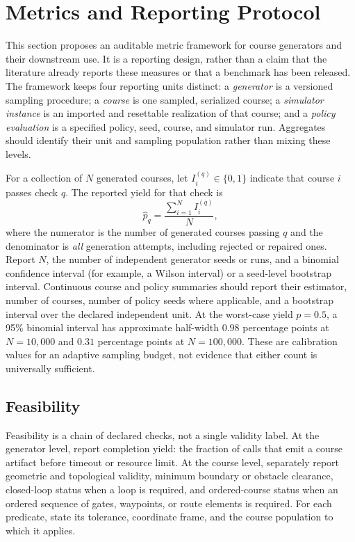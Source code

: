 \section{Metrics and Reporting Protocol}
\label{sec:metrics}

This section proposes an auditable metric framework for course generators and their
downstream use. It is a reporting design, rather than a claim that the literature
already reports these measures or that a benchmark has been released. The framework
keeps four reporting units distinct: a \emph{generator} is a versioned sampling
procedure; a \emph{course} is one sampled, serialized course; a \emph{simulator
instance} is an imported and resettable realization of that course; and a
\emph{policy evaluation} is a specified policy, seed, course, and simulator run.
Aggregates should identify their unit and sampling population rather than mixing
these levels.

For a collection of $N$ generated courses, let $I_i^{(q)}\in\{0,1\}$ indicate that
course $i$ passes check $q$. The reported yield for that check is
\begin{equation}
  \widehat{p}_q = \frac{\sum_{i=1}^{N} I_i^{(q)}}{N},
  \label{eq:metric-yield}
\end{equation}
where the numerator is the number of generated courses passing $q$ and the
denominator is \emph{all} generation attempts, including rejected or repaired
ones. Report $N$, the number of independent generator seeds or runs, and a binomial
confidence interval (for example, a Wilson interval) or a seed-level bootstrap
interval. Continuous course and policy summaries should report their estimator,
number of courses, number of policy seeds where applicable, and a bootstrap interval
over the declared independent unit.
At the worst-case yield $p=0.5$, a 95\% binomial interval has approximate
half-width $0.98$ percentage points at $N=10{,}000$ and $0.31$ percentage points at
$N=100{,}000$. These are calibration values for an adaptive sampling budget, not
evidence that either count is universally sufficient.

\subsection{Feasibility}

Feasibility is a chain of declared checks, not a single validity label. At the
generator level, report completion yield: the fraction of calls that emit a course
artifact before timeout or resource limit. At the course level, separately report
geometric and topological validity, minimum boundary or obstacle clearance,
closed-loop status when a loop is required, and ordered-course status when an ordered
sequence of gates, waypoints, or route elements is required. For each predicate,
state its tolerance, coordinate frame, and the course population to which it applies.

